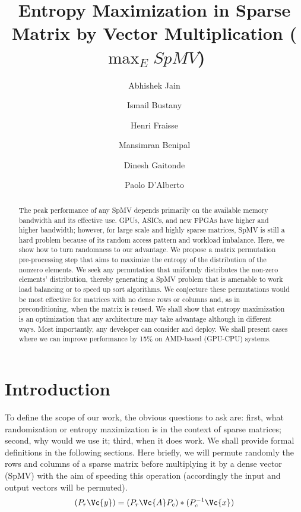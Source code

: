 \documentclass[acmsmall]{acmart}
\begin{document}
\title{Entropy Maximization in Sparse Matrix by Vector Multiplication ($\max_E SpMV$) }

\author{Abhishek Jain}
\author{Ismail Bustany}
\author{Henri Fraisse}
\author{Mansimran Benipal}
\author{Dinesh Gaitonde}
\author{Paolo D'Alberto}

\renewcommand{\shortauthors}{Jain et al.}

\begin{abstract}
The peak performance of any SpMV depends primarily on the available
memory bandwidth and its effective use. GPUs, ASICs, and new FPGAs
have higher and higher bandwidth; however, for large scale and highly
sparse matrices, SpMV is still a hard problem because of its random
access pattern and workload imbalance.  Here, we show how to turn
randomness to our advantage. We propose a matrix permutation
pre-processing step that aims to maximize the entropy of the
distribution of the nonzero elements.  We seek any permutation that
uniformly distributes the non-zero elements' distribution, thereby
generating a SpMV problem that is amenable to work load balancing or
to speed up sort algorithms.  We conjecture these permutations would
be most effective for matrices with no dense rows or columns and, as
in preconditioning, when the matrix is reused. We shall show that
entropy maximization is an optimization that any architecture may take
advantage although in different ways. Most importantly, any developer
can consider and deploy. We shall present cases where we can improve
performance by 15\% on AMD-based (GPU-CPU) systems.

\end{abstract}

\maketitle

\section{Introduction} 
\label{sec:introduction}

To define the scope of our work, the obvious questions to ask are:
first, what randomization or entropy maximization is in the context of
sparse matrices; second, why would we use it; third, when it does
work.  We shall provide formal definitions in the following
sections. Here briefly, we will permute randomly the rows and columns
of a sparse matrix before multiplying it by a dense vector (SpMV) with
the aim of speeding this operation (accordingly the input and output
vectors will be permuted).
\begin{equation}
(P_r\Vc{y}) =(P_r \Vc{A} P_c)* (P_c^{-1}\Vc{x}) 
\end{equation}
\end{document}
